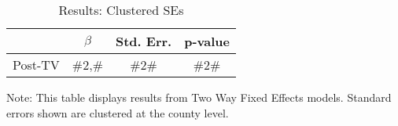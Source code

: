 \noindent 
\begin{table}[H]
\caption{Results: Clustered SEs\label{tab:regression_cluster}}
\medskip{}

\begin{centering}
\begin{tabular}{cccc}
\hline 
 & $\beta$ & Std. Err. & p-value\tabularnewline
\hline 
Post-TV & \#2,\# & \#2\# & \#2\#\tabularnewline
\hline 
\end{tabular}
\par\end{centering}
\begin{centering}
\medskip{}
\par\end{centering}
{\footnotesize{}Note: This table displays results from Two Way Fixed Effects models. Standard errors shown are clustered at the county level.}{\footnotesize\par}
\end{table}